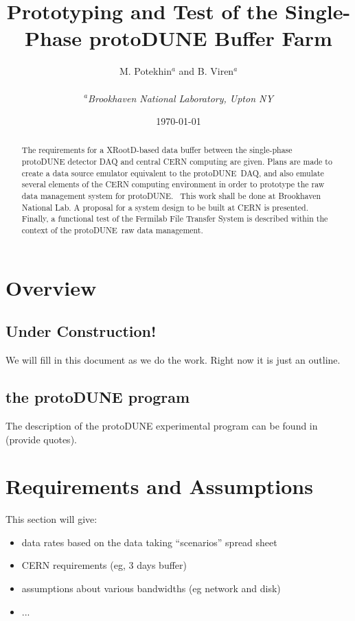 \documentclass[pdftex,12pt,letter]{article}
\title{Prototyping and Test of the Single-Phase protoDUNE Buffer Farm}
\date{\today}
\author{M. Potekhin$^a$ and B. Viren$^a$\\
\ \\
$^a$\textit{Brookhaven National Laboratory, Upton NY}
}
\newcommand{\pd}{protoDUNE\ }
\newcommand{\pdd}{protoDUNE.\ }
\begin{document}
\maketitle

\begin{abstract}
The requirements for a XRootD-based data buffer between the single-phase
protoDUNE detector DAQ and central CERN computing are given.  Plans are made to
create a data source emulator equivalent to the  \pd DAQ, and also emulate several
elements of the CERN computing  environment in order to prototype the raw data management system for \pdd
This work shall be done at Brookhaven National Lab. A proposal for a system design to be built at CERN is presented.
Finally, a functional test of the Fermilab File Transfer System is described within the context of the \pd raw
data management.
\end{abstract}

\tableofcontents

\pagebreak


\section{Overview}
\subsection{Under Construction!}
We will fill in this document as we do the work.  Right now it is just
an outline.

\subsection{the protoDUNE program}
The description of the protoDUNE experimental program can be found in (provide quotes).

\section{Requirements and Assumptions}

This section will give:
\begin{itemize}
\item data rates based on the data taking ``scenarios'' spread sheet
\item CERN requirements (eg, 3 days buffer)
\item assumptions about various bandwidths (eg network and disk)
\item ...
\end{itemize}
\end{document}
